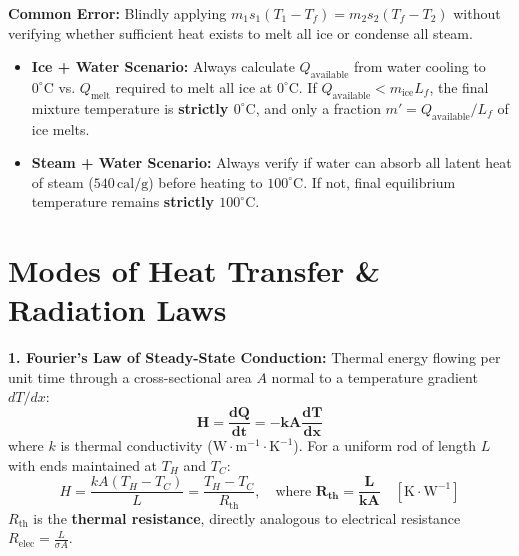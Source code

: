 \documentclass[10pt,twoside,openright]{book}
\begin{document}
\begin{trapbox}
\textbf{Common Error:} Blindly applying $m_1 s_1 (T_1 - T_f) = m_2 s_2 (T_f - T_2)$ without verifying whether sufficient heat exists to melt all ice or condense all steam.
\begin{itemize}
  \item \textbf{Ice + Water Scenario:} Always calculate $Q_{\text{available}}$ from water cooling to $0^\circ\mathrm{C}$ vs. $Q_{\text{melt}}$ required to melt all ice at $0^\circ\mathrm{C}$. If $Q_{\text{available}} < m_{\text{ice}} L_f$, the final mixture temperature is \textbf{strictly $0^\circ\mathrm{C}$}, and only a fraction $m' = Q_{\text{available}}/L_f$ of ice melts.
  \item \textbf{Steam + Water Scenario:} Always verify if water can absorb all latent heat of steam ($540\,\mathrm{cal}/\mathrm{g}$) before heating to $100^\circ\mathrm{C}$. If not, final equilibrium temperature remains \textbf{strictly $100^\circ\mathrm{C}$}.
\end{itemize}
\end{trapbox}

\section{Modes of Heat Transfer \& Radiation Laws}

\begin{conceptbox}
\textbf{1. Fourier's Law of Steady-State Conduction:}
Thermal energy flowing per unit time through a cross-sectional area $A$ normal to a temperature gradient $dT/dx$:
\begin{equation}
  \mathbf{H = \frac{dQ}{dt} = -k A \frac{dT}{dx}}
\end{equation}
where $k$ is thermal conductivity ($\mathrm{W}\cdot\mathrm{m}^{-1}\cdot\mathrm{K}^{-1}$). For a uniform rod of length $L$ with ends maintained at $T_H$ and $T_C$:
\begin{equation}
  H = \frac{k A (T_H - T_C)}{L} = \frac{T_H - T_C}{R_{\text{th}}}, \quad \text{where } \mathbf{R_{\text{th}} = \frac{L}{k A}} \quad [\mathrm{K}\cdot\mathrm{W}^{-1}]
\end{equation}
$R_{\text{th}}$ is the \textbf{thermal resistance}, directly analogous to electrical resistance $R_{\text{elec}} = \frac{L}{\sigma A}$.
\end{conceptbox}
\end{document}
